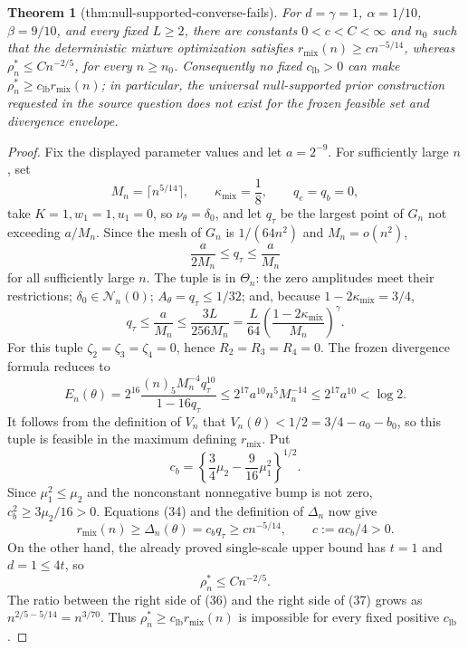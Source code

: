 \documentclass{article}
\newtheorem{theorem}{Theorem}
\begin{document}
\begin{theorem}[thm:null-supported-converse-fails]\label{thm:null-supported-converse-fails}
For \(d=\gamma=1\), \(\alpha=1/10\), \(\beta=9/10\), and every fixed \(L\ge2\), there are constants \(0<c<C<\infty\) and \(n_0\) such that the deterministic mixture optimization satisfies \(r_{\mathrm{mix}}(n)\ge c n^{-5/14}\), whereas \(\rho_n^*\le Cn^{-2/5}\), for every \(n\ge n_0\). Consequently no fixed \(c_{\mathrm{lb}}>0\) can make \(\rho_n^*\ge c_{\mathrm{lb}}r_{\mathrm{mix}}(n)\); in particular, the universal null-supported prior construction requested in the source question does not exist for the frozen feasible set and divergence envelope.
\end{theorem}
\begin{proof}
Fix the displayed parameter values and let \(a=2^{-9}\). For sufficiently large \(n\), set
\[
 M_n=\lceil n^{5/14}\rceil,
 \qquad \kappa_{\mathrm{mix}}=\frac18,
 \qquad q_e=q_b=0,
\]
take \(K=1,w_1=1,u_1=0\), so \(\nu_\theta=\delta_0\), and let \(q_\tau\) be the largest point of \(G_n\) not exceeding \(a/M_n\). Since the mesh of \(G_n\) is \(1/(64n^2)\) and \(M_n=o(n^2)\),
\[
 \frac{a}{2M_n}\le q_\tau\le\frac{a}{M_n}                            \tag{34}
\]
for all sufficiently large \(n\). The tuple is in \(\Theta_n\): the zero amplitudes meet their restrictions; \(\delta_0\in\mathcal N_n(0)\); \(A_\theta=q_\tau\le1/32\); and, because \(1-2\kappa_{\mathrm{mix}}=3/4\),
\[
 q_\tau\le\frac{a}{M_n}
 \le\frac{3L}{256M_n}
 =\frac{L}{64}\left(\frac{1-2\kappa_{\mathrm{mix}}}{M_n}\right)^\gamma.
\]
For this tuple \(\zeta_2=\zeta_3=\zeta_4=0\), hence \(R_2=R_3=R_4=0\). The frozen divergence formula reduces to
\[
 E_n(\theta)
 =2^{16}\frac{(n)_5M_n^{-4}q_\tau^{10}}{1-16q_\tau}
 \le2^{17}a^{10}n^5M_n^{-14}
 \le2^{17}a^{10}<\log2.                                              \tag{35}
\]
It follows from the definition of \(V_n\) that \(V_n(\theta)<1/2=3/4-a_0-b_0\), so this tuple is feasible in the maximum defining \(r_{\mathrm{mix}}\). Put
\[
 c_b=\left\{\frac34\mu_2-\frac9{16}\mu_1^2\right\}^{1/2}.
\]
Since \(\mu_1^2\le\mu_2\) and the nonconstant nonnegative bump is not zero, \(c_b^2\ge3\mu_2/16>0\). Equations (34) and the definition of \(\Delta_n\) now give
\[
 r_{\mathrm{mix}}(n)\ge\Delta_n(\theta)=c_bq_\tau
 \ge c n^{-5/14},\qquad c:=ac_b/4>0.                                 \tag{36}
\]
On the other hand, the already proved single-scale upper bound has \(t=1\) and \(d=1\le4t\), so
\[
 \rho_n^*\le Cn^{-2/5}.                                               \tag{37}
\]
The ratio between the right side of (36) and the right side of (37) grows as \(n^{2/5-5/14}=n^{3/70}\). Thus \(\rho_n^*\ge c_{\mathrm{lb}}r_{\mathrm{mix}}(n)\) is impossible for every fixed positive \(c_{\mathrm{lb}}\).


\end{proof}
\end{document}
